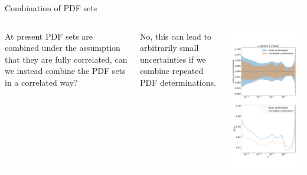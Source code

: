 \begin{frame}{Combination of PDF sets}
    	\begin{columns}[t]

			At present PDF sets are combined under the assumption that they are fully correlated, can we instead combine the PDF sets in a correlated way?

        	\vspace{0.2cm}
			No, this can lead to arbitrarily small uncertainties if we combine repeated PDF determinations.

       	\vspace{-2.7cm}
       	\begin{center}
       		\includegraphics[height=1.15\textheight]{roy_pdf_correlations/ratio_2.pdf}
       	\end{center}
			

\end{columns}
\end{frame}
